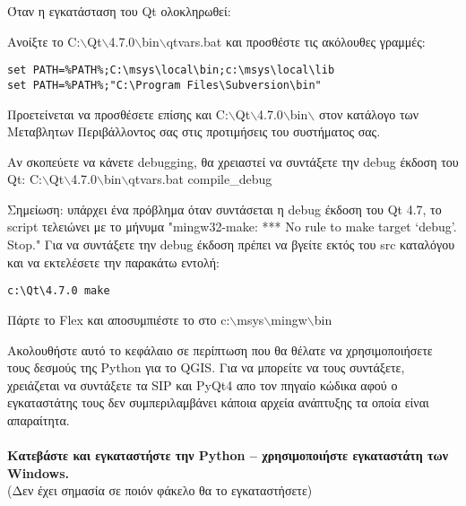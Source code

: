 Όταν η εγκατάσταση του Qt ολοκληρωθεί:

Ανοίξτε το C:$\backslash$Qt$\backslash$4.7.0$\backslash$bin$\backslash$qtvars.bat και προσθέστε τις ακόλουθες γραμμές:

\begin{verbatim}
set PATH=%PATH%;C:\msys\local\bin;c:\msys\local\lib 
set PATH=%PATH%;"C:\Program Files\Subversion\bin" 
\end{verbatim}

Προετείνεται να προσθέσετε επίσης και C:$\backslash$Qt$\backslash$4.7.0$\backslash$bin$\backslash$ στον κατάλογο των Μεταβλητων Περιβάλλοντος σας στις προτιμήσεις του συστήματος σας.

Αν σκοπεύετε να κάνετε debugging, θα χρειαστεί να συντάξετε την debug έκδοση του Qt:
C:$\backslash$Qt$\backslash$4.7.0$\backslash$bin$\backslash$qtvars.bat compile\_debug

Σημείωση: υπάρχει ένα πρόβλημα όταν συντάσεται η debug έκδοση του Qt 4.7, το script τελειώνει με το μήνυμα "mingw32-make: *** No rule to make target ‘debug’. Stop." Για να συντάξετε την debug έκδοση πρέπει να βγείτε εκτός του src καταλόγου και να εκτελέσετε την παρακάτω εντολή: 

\begin{verbatim}
c:\Qt\4.7.0 make 
\end{verbatim}

Πάρτε το Flex
και αποσυμπιέστε το στο c:$\backslash$msys$\backslash$mingw$\backslash$bin

Ακολουθήστε αυτό το κεφάλαιο σε περίπτωση που θα θέλατε να χρησιμοποιήσετε τους δεσμούς της Python για το QGIS. Για να μπορείτε να τους συντάξετε, χρειάζεται να συντάξετε τα SIP και PyQt4 απο τον πηγαίο κώδικα αφού ο εγκαταστάτης τους δεν συμπεριλαμβάνει κάποια αρχεία ανάπτυξης τα οποία είναι απαραίτητα.

\paragraph{}\textbf{Κατεβάστε και εγκαταστήστε την Python – χρησιμοποιήστε εγκαταστάτη των Windows.}\\

(Δεν έχει σημασία σε ποιόν φάκελο θα το εγκαταστήσετε)


